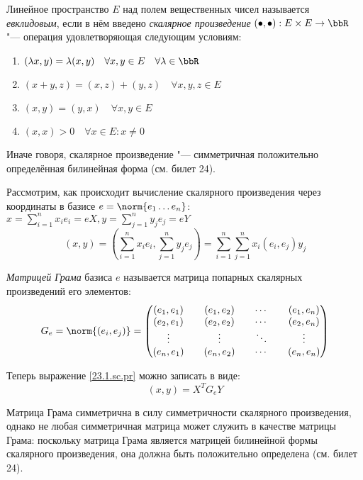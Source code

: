 \begin{defn}
Линейное пространство $E$ над полем вещественных чисел называется \textit{евклидовым}, если в нём введено \textit{скалярное произведение} $(\bullet,\bullet): E\times E \rightarrow \bbR$ "--- операция удовлетворяющая следующим условиям:
\begin{enumerate}
\item  $(\lambda x,y)=\lambda(x,y)\quad \forall x,y \in E \quad\forall \lambda \in \bbR$
\item  $(x+y,z)=(x,z)+(y,z)\quad \forall x,y,z \in E$
\item  $(x,y)=(y,x)\quad \forall x,y \in E$
\item  $(x,x)>0\quad \forall x \in E: x \neq 0$
\end{enumerate}
\end{defn}
  \begin{notion}
  Иначе говоря, скалярное произведение "--- симметричная положительно определённая билинейная форма (см. билет 24).
  \end{notion}
  Рассмотрим, как происходит вычисление скалярного произведения через координаты в базисе $e=\norm{e_1 \ldots e_n}$: $x=\sum\limits_{i=1}^nx_ie_i=eX, y=\sum\limits_{j=1}^ny_je_j=eY$
  \begin{equation}\label{23.1.sc.pr}
  (x,y)=(\sum\limits_{i=1}^nx_ie_i,\sum\limits_{j=1}^ny_je_j)=\sum\limits_{i=1}^n\sum\limits_{j=1}^nx_i(e_i,e_j)y_j
  \end{equation}
  \begin{defn}
  \textit{Матрицей Грама} базиса $e$ называется матрица попарных скалярных произведений его элементов:
  \begin{equation}
  G_e=\norm{(e_i,e_j)}=\begin{pmatrix}
  (e_1,e_1)&&(e_1,e_2)&&\cdots&&(e_1,e_n)\\
  (e_2,e_1)&&(e_2,e_2)&&\cdots&&(e_2,e_n)\\
  \vdots   && \vdots  &&\ddots&& \vdots  \\
  (e_n,e_1)&&(e_n,e_2)&&\cdots&&(e_n,e_n)\\
  \end{pmatrix}
  \end{equation}
  \end{defn}
  Теперь выражение \ref{23.1.sc.pr} можно записать в виде:
  \begin{equation}
  (x,y)=X^TG_eY
  \end{equation}
  \begin{notion}
  Матрица Грама симметрична в силу симметричности скалярного произведения, однако не любая симметричная матрица может служить в качестве матрицы Грама: поскольку матрица Грама является матрицей билинейной формы скалярного произведения, она должна быть положительно определена (см. билет 24).
  \end{notion}
  
